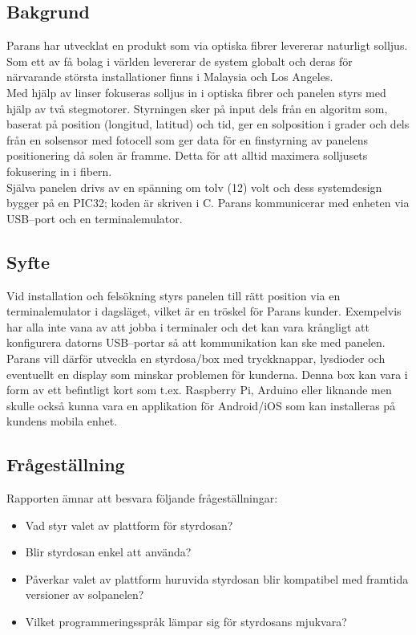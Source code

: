 \documentclass{article}
\begin{document}
        \subsection{Bakgrund} %
        \label{sub:bakgrund}
            Parans har utvecklat en produkt som via optiska fibrer levererar naturligt solljus. Som ett av få bolag i världen levererar de system globalt och deras för närvarande största installationer finns i Malaysia och Los Angeles.\\

            \noindent Med hjälp av linser fokuseras solljus in i optiska fibrer och panelen styrs med hjälp av två stegmotorer. Styrningen sker på input dels från en algoritm som, baserat på position (longitud, latitud) och tid, ger en solposition i grader och dels från en solsensor med fotocell som ger data för en finstyrning av panelens positionering då solen är framme. Detta för att alltid maximera solljusets fokusering in i fibern.\\

            \noindent Själva panelen drivs av en spänning om tolv (12) volt och dess systemdesign bygger på en PIC32; koden är skriven i C. Parans kommunicerar med enheten via USB--port och en terminalemulator. 
        
        \subsection{Syfte} %
        \label{sub:syfte}
            Vid installation och felsökning styrs panelen till rätt position via en terminalemulator i dagsläget, vilket är en tröskel för Parans kunder.  Exempelvis har alla inte vana av att jobba i terminaler och det kan vara krångligt att konfigurera datorns USB--portar så att kommunikation kan ske med panelen. \\

            \noindent Parans vill därför utveckla en styrdosa/box med tryckknappar, lysdioder och eventuellt en display som minskar problemen för kunderna. Denna box kan vara i form av ett befintligt kort som t.ex. Raspberry Pi, Arduino eller liknande men skulle också kunna vara en applikation för Android/iOS som kan installeras på kundens mobila enhet.

        \subsection{Frågeställning} %
        \label{sub:fragestallning}
        Rapporten ämnar att besvara följande frågeställningar:
        \begin{itemize}
            \item Vad styr valet av plattform för styrdosan?
            \item Blir styrdosan enkel att använda?
            \item Påverkar valet av plattform huruvida styrdosan blir kompatibel med framtida versioner av solpanelen?
            \item Vilket programmeringsspråk lämpar sig för styrdosans mjukvara?
        \end{itemize}   
        
\end{document}
